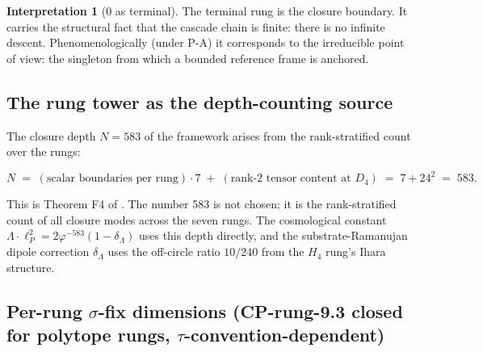 \documentclass[11pt]{article}
\theoremstyle{plain}
\theoremstyle{definition}
\newtheorem{interpretation}[theorem]{Interpretation}
\theoremstyle{remark}
\begin{document}
\begin{interpretation}[0 as terminal]\label{int:rung-0}
The terminal rung is the closure boundary. It carries the structural fact that the cascade chain is finite: there is no infinite descent. Phenomenologically (under P-A) it corresponds to the irreducible point of view: the singleton from which a bounded reference frame is anchored.
\end{interpretation}

\subsection{The rung tower as the depth-counting source}

The closure depth $N = 583$ of the framework arises from the rank-stratified count over the rungs:

\begin{equation}\label{eq:n583}
  N \;=\; (\text{scalar boundaries per rung}) \cdot 7 \;+\; (\text{rank-2 tensor content at } D_4) \;=\; 7 + 24^2 \;=\; 583.
\end{equation}

This is Theorem F4 of \citet{SmartXXXVI}. The number 583 is not chosen; it is the rank-stratified count of all closure modes across the seven rungs. The cosmological constant $\Lambda \cdot \ell_P^2 = 2 \varphi^{-583}(1 - \delta_\Lambda)$ uses this depth directly, and the substrate-Ramanujan dipole correction $\delta_\Lambda$ uses the off-circle ratio $10/240$ from the $H_4$ rung's Ihara structure.

\subsection{Per-rung $\sigma$-fix dimensions (CP-rung-9.3 closed for polytope rungs, $\tau$-convention-dependent)}
\end{document}
